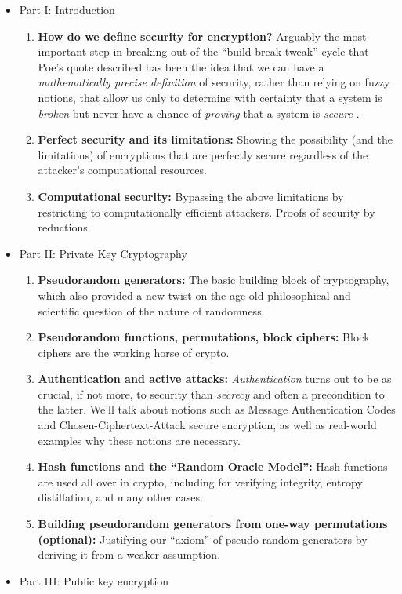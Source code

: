 \begin{itemize}
\item
  Part I: Introduction

  \begin{enumerate}
  \def\labelenumi{\arabic{enumi}.}
  \item
    \textbf{How do we define security for encryption?} Arguably the most
    important step in breaking out of the ``build-break-tweak'' cycle
    that Poe's quote described has been the idea that we can have a
    \emph{mathematically precise definition} of security, rather than
    relying on fuzzy notions, that allow us only to determine with
    certainty that a system is \emph{broken} but never have a chance of
    \emph{proving} that a system is \emph{secure} .
  \item
    \textbf{Perfect security and its limitations:} Showing the
    possibility (and the limitations) of encryptions that are perfectly
    secure regardless of the attacker's computational resources.
  \item
    \textbf{Computational security:} Bypassing the above limitations by
    restricting to computationally efficient attackers. Proofs of
    security by reductions.
  \end{enumerate}
\item
  Part II: Private Key Cryptography

  \begin{enumerate}
  \def\labelenumi{\arabic{enumi}.}
  \item
    \textbf{Pseudorandom generators:} The basic building block of
    cryptography, which also provided a new twist on the age-old
    philosophical and scientific question of the nature of randomness.
  \item
    \textbf{Pseudorandom functions, permutations, block ciphers:} Block
    ciphers are the working horse of crypto.
  \item
    \textbf{Authentication and active attacks:} \emph{Authentication}
    turns out to be as crucial, if not more, to security than
    \emph{secrecy} and often a precondition to the latter. We'll talk
    about notions such as Message Authentication Codes and
    Chosen-Ciphertext-Attack secure encryption, as well as real-world
    examples why these notions are necessary.
  \item
    \textbf{Hash functions and the ``Random Oracle Model'':} Hash
    functions are used all over in crypto, including for verifying
    integrity, entropy distillation, and many other cases.
  \item
    \textbf{Building pseudorandom generators from one-way permutations
    (optional):} Justifying our ``axiom'' of pseudo-random generators by
    deriving it from a weaker assumption.
  \end{enumerate}
\item
  Part III: Public key encryption


\end{itemize}
